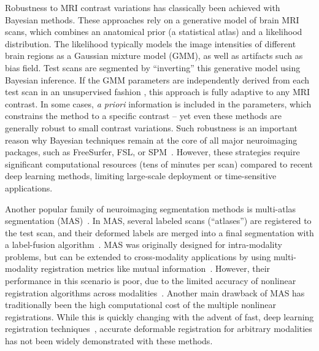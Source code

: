 \documentclass{midl}
\begin{document}
Robustness to MRI contrast variations has classically been achieved with Bayesian methods. These approaches rely on a generative model of brain MRI scans, which combines an anatomical prior (a statistical atlas) and a likelihood distribution. The likelihood typically models the image intensities of different brain regions as a Gaussian mixture model (GMM), as well as artifacts such as bias field. Test scans are segmented by ``inverting'' this  generative model using Bayesian inference. 
If the GMM parameters are independently derived from each test scan in an unsupervised fashion \cite{van_leemput_automated_1999,zhang_segmentation_2001,ashburner_unified_2005}, this approach is fully adaptive to any MRI contrast. In some cases, \emph{a priori} information is included in the parameters, which constrains the method to a specific contrast \cite{wells_adaptive_1996,fischl_whole_2002,patenaude_bayesian_2011} -- yet even these methods are generally robust to small contrast variations.  Such robustness is an important reason why Bayesian techniques remain at the core of all major neuroimaging packages, such as FreeSurfer, FSL, or SPM~\cite{ashburner_spm_2012}. However, these strategies require significant computational resources (tens of minutes per scan) compared to recent deep learning methods, limiting large-scale deployment or time-sensitive applications.

Another popular family of neuroimaging segmentation methods is multi-atlas segmentation (MAS)~\cite{rohlfing_evaluation_2004,iglesias_multi-atlas_2015}. In MAS, several labeled scans (``atlases'') are registered to the test scan, and their deformed labels are merged into a final segmentation with a label-fusion algorithm~\cite{sabuncu_generative_2010}. MAS was originally designed for intra-modality problems, but can be extended to cross-modality applications by using multi-modality registration metrics like mutual information~\cite{wells_adaptive_1996,maes_multimodality_1997}. However, their performance in this scenario is poor, due to the limited accuracy of nonlinear registration algorithms across modalities~\cite{iglesias_is_2013}. Another main drawback of MAS has traditionally been the high computational cost of the multiple nonlinear registrations. While this is quickly changing with the advent of fast, deep learning registration techniques~\cite{balakrishnan_voxelmorph_2019,de_vos_end--end_2017}, accurate deformable registration for arbitrary modalities has not been widely demonstrated with these methods.
\end{document}
